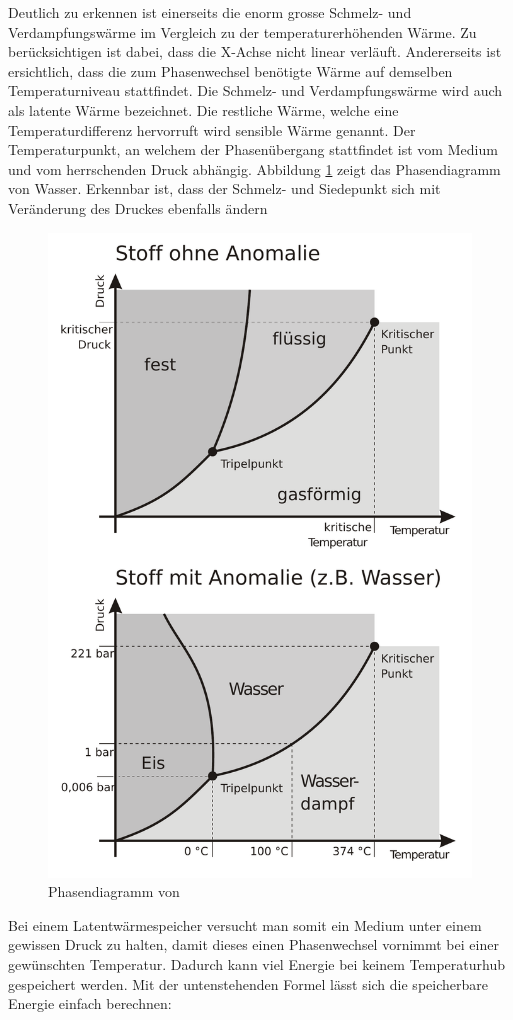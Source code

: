 \documentclass[11pt,a4paper]{scrartcl}
\begin{document}
Deutlich zu erkennen ist einerseits die enorm grosse Schmelz- und
Verdampfungswärme im Vergleich zu der temperaturerhöhenden Wärme. Zu
berücksichtigen ist dabei, dass die X-Achse nicht linear verläuft. Andererseits
ist ersichtlich, dass die zum Phasenwechsel benötigte Wärme auf demselben
Temperaturniveau stattfindet. Die Schmelz- und Verdampfungswärme wird auch als
latente Wärme bezeichnet. Die restliche Wärme, welche eine Temperaturdifferenz
hervorruft wird sensible Wärme genannt.
Der Temperaturpunkt, an welchem der Phasenübergang stattfindet ist vom Medium
und vom herrschenden Druck abhängig. Abbildung \ref{fig:H2O2} zeigt das
Phasendiagramm von Wasser. Erkennbar ist, dass der Schmelz- und Siedepunkt sich
mit Veränderung des Druckes ebenfalls ändern
\begin{figure}[h!]
\begin{center}
\includegraphics[scale=0.6]{images/Phasendiagramm2d.pdf}
\caption{Phasendiagramm von  \cite{Phasendiagramm}}
\label{fig:H2O2}
\end{center}
\end{figure}
Bei einem Latentwärmespeicher versucht man somit ein Medium unter einem gewissen
Druck zu halten, damit dieses einen Phasenwechsel vornimmt bei einer gewünschten
Temperatur. Dadurch kann viel Energie bei keinem Temperaturhub gespeichert
werden. Mit der untenstehenden Formel lässt sich die speicherbare Energie
einfach berechnen:
\end{document}

